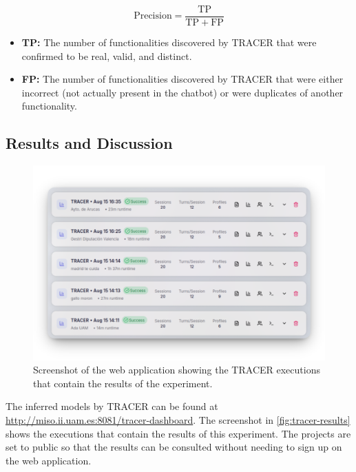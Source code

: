 \begin{equation}
\label{eq:precision}
\text{Precision} = \frac{\mathrm{TP}}{\mathrm{TP} + \mathrm{FP}}
\end{equation}

\begin{itemize}
  \item \textbf{\acf{TP}:}
    The number of functionalities discovered by \ac{TRACER}
    that were confirmed to be real, valid, and distinct.
  \item \textbf{\acf{FP}:}
    The number of functionalities discovered by \ac{TRACER}
    that were either incorrect
    (not actually present in the chatbot)
    or were duplicates of another functionality.
\end{itemize}

\subsection{Results and Discussion}

\begin{figure}[!htb]
  \begin{center}
    \includegraphics[width=\textwidth]{figures/tracer-results.png}
  \end{center}
  \caption{Screenshot of the web application showing
    the TRACER executions that contain the results of the experiment.}
  \label{fig:tracer-results}
\end{figure}

The inferred models by \ac{TRACER} can be found at
\url{http://miso.ii.uam.es:8081/tracer-dashboard}.
The screenshot in \autoref{fig:tracer-results}
shows the executions that contain the results of this experiment.
The projects are set to public
so that the results can be consulted
without needing to sign up on the web application.

